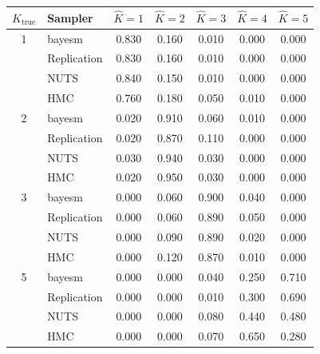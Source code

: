 \begin{tabular}{clccccc}
\toprule
$K_{\text{true}}$ & Sampler & $\hat K{=}1$ & $\hat K{=}2$ & $\hat K{=}3$ & $\hat K{=}4$ & $\hat K{=}5$ \\
\midrule
1 & bayesm & 0.830 & 0.160 & 0.010 & 0.000 & 0.000 \\
 & Replication & 0.830 & 0.160 & 0.010 & 0.000 & 0.000 \\
 & NUTS & 0.840 & 0.150 & 0.010 & 0.000 & 0.000 \\
 & HMC & 0.760 & 0.180 & 0.050 & 0.010 & 0.000 \\
2 & bayesm & 0.020 & 0.910 & 0.060 & 0.010 & 0.000 \\
 & Replication & 0.020 & 0.870 & 0.110 & 0.000 & 0.000 \\
 & NUTS & 0.030 & 0.940 & 0.030 & 0.000 & 0.000 \\
 & HMC & 0.020 & 0.950 & 0.030 & 0.000 & 0.000 \\
3 & bayesm & 0.000 & 0.060 & 0.900 & 0.040 & 0.000 \\
 & Replication & 0.000 & 0.060 & 0.890 & 0.050 & 0.000 \\
 & NUTS & 0.000 & 0.090 & 0.890 & 0.020 & 0.000 \\
 & HMC & 0.000 & 0.120 & 0.870 & 0.010 & 0.000 \\
5 & bayesm & 0.000 & 0.000 & 0.040 & 0.250 & 0.710 \\
 & Replication & 0.000 & 0.000 & 0.010 & 0.300 & 0.690 \\
 & NUTS & 0.000 & 0.000 & 0.080 & 0.440 & 0.480 \\
 & HMC & 0.000 & 0.000 & 0.070 & 0.650 & 0.280 \\
\bottomrule
\end{tabular}
